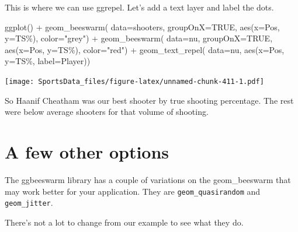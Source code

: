 \documentclass[
]{book}
\newenvironment{Shaded}{\begin{snugshade}}{\end{snugshade}}
\newcommand{\AttributeTok}[1]{\textcolor[rgb]{0.77,0.63,0.00}{#1}}
\newcommand{\ConstantTok}[1]{\textcolor[rgb]{0.00,0.00,0.00}{#1}}
\newcommand{\FunctionTok}[1]{\textcolor[rgb]{0.00,0.00,0.00}{#1}}
\newcommand{\NormalTok}[1]{#1}
\newcommand{\SpecialCharTok}[1]{\textcolor[rgb]{0.00,0.00,0.00}{#1}}
\newcommand{\StringTok}[1]{\textcolor[rgb]{0.31,0.60,0.02}{#1}}
\begin{document}
This is where we can use ggrepel. Let's add a text layer and label the dots.

\begin{Shaded}
\begin{Highlighting}[]
\FunctionTok{ggplot}\NormalTok{() }\SpecialCharTok{+} 
  \FunctionTok{geom\_beeswarm}\NormalTok{(}
    \AttributeTok{data=}\NormalTok{shooters, }
    \AttributeTok{groupOnX=}\ConstantTok{TRUE}\NormalTok{, }
    \FunctionTok{aes}\NormalTok{(}\AttributeTok{x=}\NormalTok{Pos, }\AttributeTok{y=}\StringTok{\textasciigrave{}}\AttributeTok{TS\%}\StringTok{\textasciigrave{}}\NormalTok{), }\AttributeTok{color=}\StringTok{"grey"}\NormalTok{) }\SpecialCharTok{+} 
  \FunctionTok{geom\_beeswarm}\NormalTok{(}
    \AttributeTok{data=}\NormalTok{nu, }
    \AttributeTok{groupOnX=}\ConstantTok{TRUE}\NormalTok{, }
    \FunctionTok{aes}\NormalTok{(}\AttributeTok{x=}\NormalTok{Pos, }\AttributeTok{y=}\StringTok{\textasciigrave{}}\AttributeTok{TS\%}\StringTok{\textasciigrave{}}\NormalTok{), }\AttributeTok{color=}\StringTok{"red"}\NormalTok{) }\SpecialCharTok{+} 
  \FunctionTok{geom\_text\_repel}\NormalTok{(}
    \AttributeTok{data=}\NormalTok{nu, }
    \FunctionTok{aes}\NormalTok{(}\AttributeTok{x=}\NormalTok{Pos, }\AttributeTok{y=}\StringTok{\textasciigrave{}}\AttributeTok{TS\%}\StringTok{\textasciigrave{}}\NormalTok{, }\AttributeTok{label=}\NormalTok{Player))}
\end{Highlighting}
\end{Shaded}

\texttt{[image: SportsData\_files/figure-latex/unnamed-chunk-411-1.pdf]}

So Haanif Cheatham was our best shooter by true shooting percentage. The rest were below average shooters for that volume of shooting.

\hypertarget{a-few-other-options}{%
\section{A few other options}\label{a-few-other-options}}

The ggbeeswarm library has a couple of variations on the geom\_beeswarm that may work better for your application. They are \texttt{geom\_quasirandom} and \texttt{geom\_jitter}.

There's not a lot to change from our example to see what they do.
\end{document}
